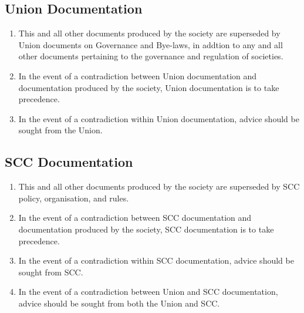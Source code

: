 \documentclass{scrartcl}
\begin{document}
        \subsection{Union Documentation}
            \label{documentation--union}
            \begin{enumerate}
                \item This and all other documents produced by the society are superseded by Union documents on Governance and Bye-laws, in addtion to any and all other documents pertaining to the governance and regulation of societies.
                \item In the event of a contradiction between Union documentation and documentation produced by the society, Union documentation is to take precedence.
                \item In the event of a contradiction within Union documentation, advice should be sought from the Union.
            \end{enumerate}

        \subsection{SCC Documentation}
            \label{documentation--scc}
            \begin{enumerate}
                \item This and all other documents produced by the society are superseded by SCC policy, organisation, and rules.
                \item In the event of a contradiction between SCC documentation and documentation produced by the society, SCC documentation is to take precedence.
                \item In the event of a contradiction within SCC documentation, advice should be sought from SCC.
                \item In the event of a contradiction between Union and SCC documentation, advice should be sought from both the Union and SCC.
            \end{enumerate}
\end{document}
